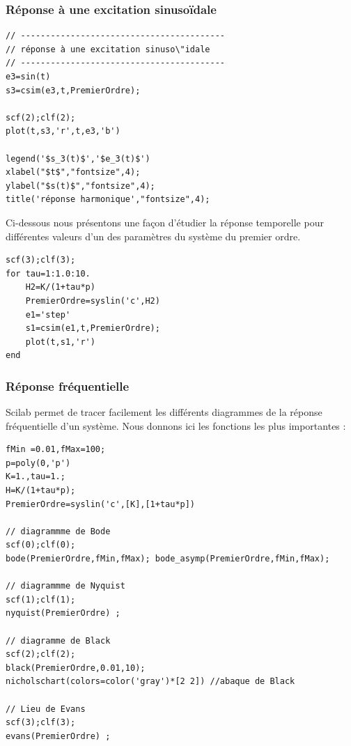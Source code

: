 \subsubsection{Réponse à une excitation sinuso\"idale}
\begin{code}
\begin{verbatim}
// -----------------------------------------
// réponse à une excitation sinuso\"idale 
// -----------------------------------------
e3=sin(t)
s3=csim(e3,t,PremierOrdre);

scf(2);clf(2);
plot(t,s3,'r',t,e3,'b')

legend('$s_3(t)$','$e_3(t)$')
xlabel("$t$","fontsize",4);
ylabel("$s(t)$","fontsize",4); 
title('réponse harmonique',"fontsize",4);
\end{verbatim}
\end{code}

Ci-dessous nous présentons une façon d'étudier la réponse temporelle pour
différentes valeurs d'un des paramètres du système du premier ordre.
\begin{code}
\begin{verbatim}
scf(3);clf(3);
for tau=1:1.0:10.
    H2=K/(1+tau*p)
    PremierOrdre=syslin('c',H2)
    e1='step'
    s1=csim(e1,t,PremierOrdre);
    plot(t,s1,'r')
end
\end{verbatim}
\end{code}


\subsubsection{Réponse fréquentielle}
Scilab permet de tracer facilement les différents diagrammes de la réponse fréquentielle d'un système.
Nous donnons ici les fonctions les plus importantes : 
\begin{code}
\begin{verbatim}
fMin =0.01,fMax=100;
p=poly(0,'p')
K=1.,tau=1.;
H=K/(1+tau*p);
PremierOrdre=syslin('c',[K],[1+tau*p])

// diagrammme de Bode
scf(0);clf(0);
bode(PremierOrdre,fMin,fMax); bode_asymp(PremierOrdre,fMin,fMax);

// diagrammme de Nyquist
scf(1);clf(1);
nyquist(PremierOrdre) ;

// diagramme de Black
scf(2);clf(2);
black(PremierOrdre,0.01,10);
nicholschart(colors=color('gray')*[2 2]) //abaque de Black

// Lieu de Evans
scf(3);clf(3);
evans(PremierOrdre) ;
\end{verbatim}
\end{code}

